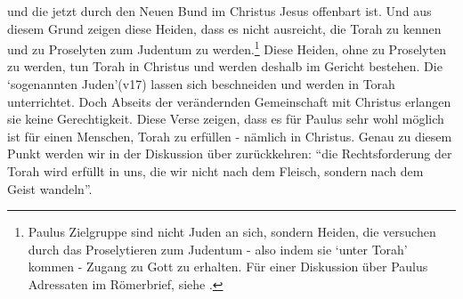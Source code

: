 und die jetzt durch den Neuen Bund im Christus Jesus offenbart ist.
Und aus diesem Grund zeigen diese Heiden, dass es nicht ausreicht, die Torah zu kennen und zu Proselyten zum Judentum zu werden.\footnote{
	Paulus Zielgruppe sind nicht Juden an sich, sondern Heiden, die versuchen durch das Proselytieren zum Judentum - also indem sie `unter Torah' kommen -
	Zugang zu Gott zu erhalten. Für einer Diskussion über Paulus Adressaten im Römerbrief, siehe \Cite{the-so-called-jew}.
} Diese Heiden, ohne zu Proselyten zu werden, tun Torah in Christus und werden deshalb im Gericht bestehen.
Die `sogenannten Juden'(v17) lassen sich beschneiden und werden in Torah unterrichtet.
Doch Abseits der verändernden Gemeinschaft mit Christus erlangen sie keine Gerechtigkeit.
Diese Verse zeigen, dass es für Paulus sehr wohl möglich ist für einen Menschen, Torah zu erfüllen - nämlich in Christus.
Genau zu diesem Punkt werden wir in der Diskussion über  zurückkehren: ``die Rechtsforderung der Torah wird erfüllt in uns, die wir nicht nach dem Fleisch, sondern nach dem Geist wandeln''.

